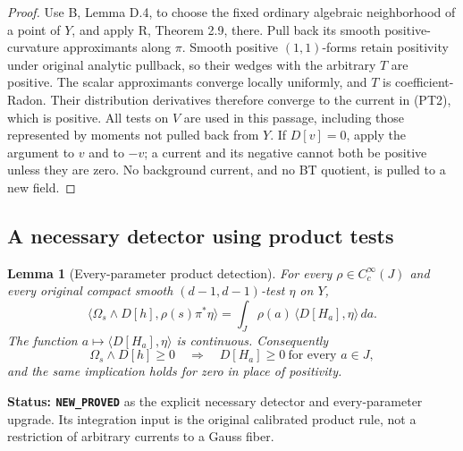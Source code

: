 \documentclass[11pt,a4paper]{article}
\numberwithin{equation}{section}
\newtheorem{lemma}[theorem]{Lemma}
\theoremstyle{definition}
\theoremstyle{remark}
\begin{document}
\begin{proof}
Use B, Lemma D.4, to choose the fixed ordinary algebraic neighborhood
of a point of $Y$, and apply R, Theorem 2.9, there. Pull back its
smooth positive-curvature approximants along $\pi$. Smooth positive
$(1,1)$-forms retain positivity under original analytic pullback, so
their wedges with the arbitrary $T$ are positive. The scalar
approximants converge locally uniformly, and $T$ is coefficient-Radon.
Their distribution derivatives therefore converge to the current
in (PT2), which is positive. All tests on $V$ are used in this
passage, including those represented by moments not pulled back from
$Y$. If $D[v]=0$, apply the argument to $v$ and to $-v$; a current
and its negative cannot both be positive unless they are zero.
No background current, and no BT quotient, is pulled to a new field.
\end{proof}

\subsection{A necessary detector using product tests}

\begin{lemma}[Every-parameter product detection]
\label{lem:r12-every-parameter-product-detector}
For every $\rho\in C_c^\infty(J)$ and every original compact
smooth $(d-1,d-1)$-test $\eta$ on $Y$,
\[
 \bigl\langle\Omega_s\wedge D[h],\rho(s)\pi^*\eta\bigr\rangle
             =\int_J\rho(a)\,\langle D[H_a],\eta\rangle\,da.
 \tag{PT3}
\]
The function $a\mapsto\langle D[H_a],\eta\rangle$ is continuous.
Consequently
\[
 \Omega_s\wedge D[h]\ge0\quad\Longrightarrow\quad
                            D[H_a]\ge0\ \text{for every }a\in J,
 \tag{PT4}
\]
and the same implication holds for zero in place of positivity.
\end{lemma}

\noindent\textbf{Status: \texttt{NEW\_PROVED}} as the explicit
necessary detector and every-parameter upgrade. Its integration
input is the original calibrated product rule, not a restriction
of arbitrary currents to a Gauss fiber.
\end{document}
